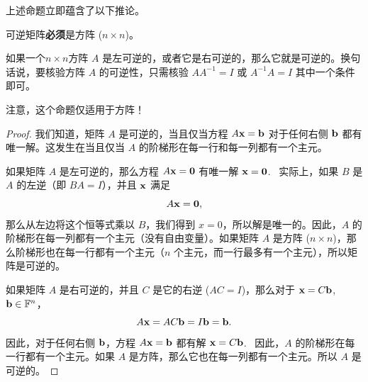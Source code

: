 上述命题立即蕴含了以下推论。

\begin{corollary}\label{stmt:02-03-07}
可逆矩阵\textbf{必须}是方阵 ($n \times n$)。
\end{corollary}

\begin{proposition}\label{stmt:02-03-08}
如果一个$n \times n$方阵  $A$ 是左可逆的，或者它是右可逆的，那么它就是可逆的。换句话说，要核验方阵 $A$ 的可逆性，只需核验 $A A^{-1} = I$ 或 $A^{-1} A = I$ 其中一个条件即可。
\end{proposition}

注意，这个命题仅适用于方阵！

\begin{proof} 我们知道，矩阵 $A$ 是可逆的，当且仅当方程 $A \mathbf{x} = \mathbf{b}$ 对于任何右侧 $\mathbf{b}$ 都有唯一解。这发生在当且仅当 $A$ 的阶梯形在每一行和每一列都有一个主元。

如果矩阵 $A$ 是左可逆的，那么方程 $A \mathbf{x} = \mathbf{0}$ 有唯一解 $\mathbf{x} = \mathbf{0}$. ~实际上，如果 $B$ 是 $A$ 的左逆（即 $BA = I$），并且 $\mathbf{x}$ 满足
$$A \mathbf{x} = \mathbf{0},$$
那么从左边将这个恒等式乘以 $B$，我们得到 $x = 0$，所以解是唯一的。因此，$A$ 的阶梯形在每一列都有一个主元（没有自由变量）。如果矩阵 $A$ 是方阵 ($n \times n$)，那么阶梯形也在每一行都有一个主元（$n$ 个主元，而一行最多有一个主元），所以矩阵是可逆的。

如果矩阵 $A$ 是右可逆的，并且 $C$ 是它的右逆 ($AC = I$)，那么对于 $\mathbf{x} = C \mathbf{b}$, $\mathbf{b} \in \mathbb{F}^n$，
$$A \mathbf{x} = AC \mathbf{b} = I \mathbf{b} = \mathbf{b}.$$
因此，对于任何右侧 $\mathbf{b}$，方程 $A \mathbf{x} = \mathbf{b}$ 都有解 $\mathbf{x} = C \mathbf{b}$. ~因此，$A$ 的阶梯形在每一行都有一个主元。如果 $A$ 是方阵，那么它也在每一列都有一个主元。所以 $A$ 是可逆的。\end{proof}

